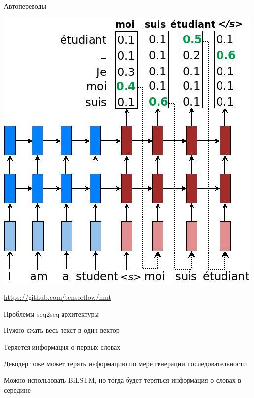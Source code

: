 \documentclass[notes,12pt, aspectratio=169]{beamer}
\newenvironment{wideitemize}{\itemize\addtolength{\itemsep}{10pt}}{\enditemize}
\begin{document}
\begin{frame}{Автопереводы} 
	\begin{center}
		\includegraphics[width=.42\linewidth]{greedy_dec.jpg}
	\end{center}

\vfill
\footnotesize
{\color{blue} \url{https://github.com/tensorflow/nmt}}
\end{frame}


\begin{frame}{Проблемы seq2seq архитектуры} 
\begin{wideitemize}
	\item  Нужно сжать весь текст в один вектор
	\item  Теряется информация о первых словах
	\item  Декодер тоже может терять информацию по мере генерации
	последовательности
	\item  Можно использовать BiLSTM, но тогда будет теряться
	информация о словах в середине
\end{wideitemize}
\end{frame}
\end{document}
